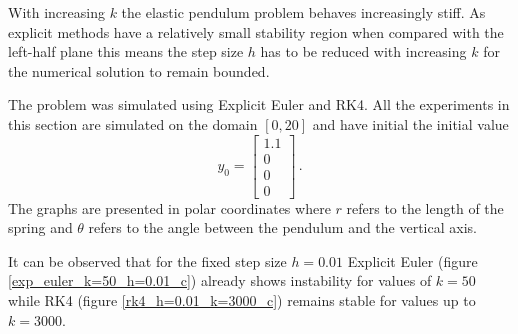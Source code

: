\documentclass{report}
\newcommand{\vect}[1]{\begin{bmatrix} #1 \end{bmatrix}}
\begin{document}
With increasing $k$ the elastic pendulum problem behaves increasingly stiff. As explicit methods have a relatively small stability region when compared with the left-half plane this means the step size $h$ has to be reduced with increasing $k$ for the numerical solution to remain bounded.


The problem was simulated using Explicit Euler and RK4.
All the experiments in this section are simulated on the domain $[0,20]$ and have initial the initial value $$y_0 = \vect{1.1 \\ 0 \\ 0 \\ 0}\,.$$
The graphs are presented in polar coordinates where $r$ refers to the length of the spring and $\theta$ refers to the angle between the pendulum and the vertical axis.

It can be observed that for the fixed step size $h=0.01$ Explicit Euler (figure \ref{exp_euler_k=50_h=0.01_c}) already shows instability for values of $k=50$ while RK4 (figure \ref{rk4_h=0.01_k=3000_c}) remains stable for values up to $k=3000$.
\end{document}
